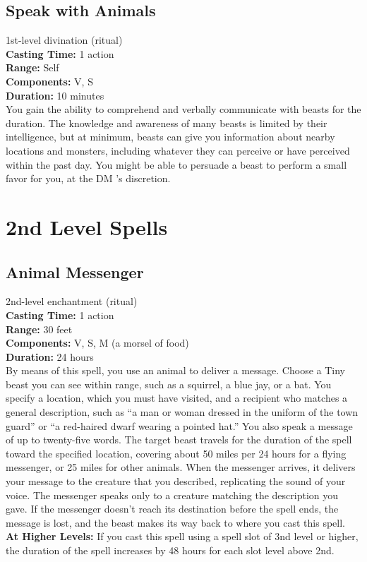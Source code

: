 \documentclass[11pt, A4paper, english]{article}
\begin{document}
		\subsection{Speak with Animals}
1st-level divination (ritual) \\
\textbf{Casting Time:} 1 action \\
\textbf{Range:} Self \\
\textbf{Components:} V, S \\
\textbf{Duration:} 10 minutes \\
You gain the ability to comprehend and verbally communicate with beasts for the duration. The knowledge and awareness of many beasts is limited by their intelligence, but at minimum, beasts can give you information about nearby locations and monsters, including whatever they can perceive or have perceived within the past day. You might be able to persuade a beast to perform a small favor for you, at the DM ’s discretion.



	\section{2nd Level Spells}
		\subsection{Animal Messenger}
2nd-level enchantment (ritual) \\
\textbf{Casting Time:} 1 action \\
\textbf{Range:} 30 feet \\
\textbf{Components:} V, S, M (a morsel of food) \\
\textbf{Duration:} 24 hours \\
By means of this spell, you use an animal to deliver a message. Choose a Tiny beast you can see within range, such as a squirrel, a blue jay, or a bat. You specify a location, which you must have visited, and a recipient who matches a general description, such as “a man or woman dressed in the uniform of the town guard” or “a red-haired dwarf wearing a pointed hat.” You also speak a message of up to twenty-five words. The target beast travels for the duration of the spell toward the specified location, covering about 50 miles per 24 hours for a flying messenger, or 25 miles for other animals. When the messenger arrives, it delivers your message to the creature that you described, replicating the sound of your voice. The messenger speaks only to a creature matching the description you gave. If the messenger doesn’t reach its destination before the spell ends, the message is lost, and the beast makes its way back to where you cast this spell. \\
\textbf{At Higher Levels:} If you cast this spell using a spell slot of 3nd level or higher, the duration of the spell increases by 48 hours for each slot level above 2nd.
\end{document}

